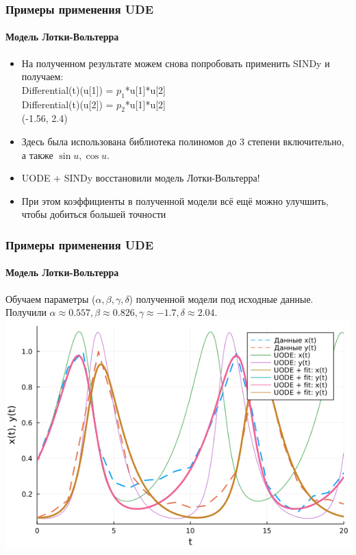 \documentclass[10pt,pdf,hyperref={unicode}]{beamer}
\begin{document}
			\begin{frame}
				\frametitle{Примеры применения UDE} 
				\framesubtitle{Модель Лотки-Вольтерра}
				\begin{center}
					\begin{itemize}
						\item На полученном результате можем снова попробовать применить SINDy и получаем: \\
						Differential(t)(u[1]) = $p_1$*u[1]*u[2]\\
						Differential(t)(u[2]) = $p_2$*u[1]*u[2]\\
						(-1.56, 2.4)\\
						\item Здесь была использована библиотека полиномов до 3 степени включительно, а также $\sin{u}, \cos{u}$. 
						\item UODE + SINDy восстановили модель Лотки-Вольтерра!
						\item При этом коэффициенты в полученной модели всё ещё можно улучшить, чтобы добиться большей точности
					\end{itemize}
				\end{center}
			\end{frame}
		
			\begin{frame}
				\frametitle{Примеры применения UDE} 
				\framesubtitle{Модель Лотки-Вольтерра}
				\begin{center}
					Обучаем параметры ($\alpha, \beta, \gamma, \delta$) полученной модели под исходные данные. Получили $\alpha \approx 0.557, \beta \approx 0.826, \gamma \approx -1.7, \delta \approx 2.04$.
					\includegraphics[width=0.7\linewidth]{recover_fit.png}
				\end{center}
			\end{frame}
		
\end{document}
